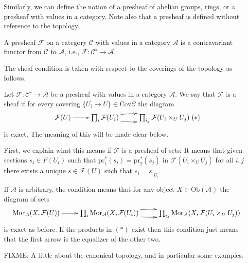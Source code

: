 \smallskip\noindent
Similarly, we can define the notion of a presheaf of abelian groups, rings,
or a presheaf with values in a category. Note also that a presheaf is defined
without reference to the topology.

\begin{definition}
\label{definition-presheaf}
A presheaf $\mathcal{F}$ on a category $\mathcal{C}$ with values in a category
$\mathcal{A}$ is a contravariant functor from $\mathcal{C}$ to $\mathcal{A}$,
i.e., $\mathcal{F} : \mathcal{C}^\circ \to \mathcal{A}$.
\end{definition}

\noindent
The sheaf condition is taken with respect to the coverings of the 
topology as follows.

\begin{definition}
\label{definition-sheaf}
Let $\mathcal{F} : \mathcal{C}^\circ \to \mathcal{A}$ be a presheaf 
with values in a category $\mathcal{A}$. We say that $\mathcal{F}$ 
is a sheaf if for every covering $\{U_i \to U\} \in \text{Cov} \mathcal{C}$ 
the diagram
$$
\xymatrix{
\mathcal{F}(U) \ar[r] 
& 
\prod\nolimits_i \mathcal{F}(U_i) \ar@/^/[r] \ar@/_/[r] 
&
\prod\nolimits_{ij} \mathcal{F}(U_i\times_U U_j)
}
\leqno{(*)}
$$
is exact. The meaning of this will be made clear below.
\end{definition}

\noindent
First, we explain what this means if $\mathcal{F}$ is a presheaf of sets:
It means that given sections $s_i \in F(U_i)$ such that
$\text{pr}_1^\ast(s_i) = \text{pr}_2^\ast(s_j)$ in 
$\mathcal{F}(U_i \times_U U_j)$ for all $i,j$ there exists a unique
$s \in \mathcal{F}(U)$ such that $s_i = s|_{U_i}$.

\smallskip\noindent
If $\mathcal{A}$ is arbitrary, the condition means that for any
object $X\in \text{Ob}(\mathcal{A})$ the diagram of sets
$$
\xymatrix{
\text{Mor}_\mathcal{A}(X,\mathcal{F}(U)) \ar[r] 
& 
\prod\nolimits_i \text{Mor}_\mathcal{A}(X,\mathcal{F}(U_i)) 
\ar@/^/[r] \ar@/_/[r] 
&
\prod\nolimits_{ij} \text{Mor}_\mathcal{A}(X,\mathcal{F}(U_i\times_U U_j))
}
$$
is exact as before. If the products in $(*)$ exist then this condition just
means that the first arrow is the equalizer of the other two.

FIXME: A little about the canonical topology, and in particular some examples.

